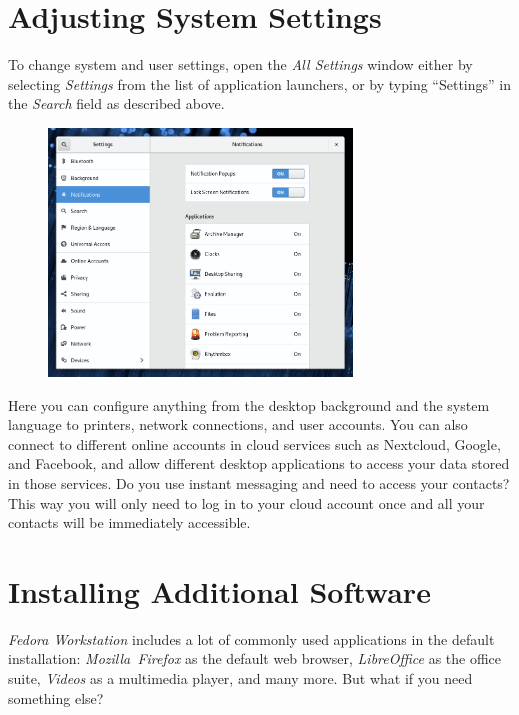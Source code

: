 \section*{Adjusting System Settings}

To change system and user settings, open the \emph{All Settings} window either by selecting \emph{Settings} from the list of application launchers, or by typing \enquote{Settings} in the \emph{Search} field as described above.

\begin{figure}[tbp]
\begin{center}
\includegraphics[width=0.72\textwidth]{img/settings}
 \label{fig:settings}
\end{center}
\end{figure}

Here you can configure anything from the desktop background and the system language to printers, network connections, and user accounts. You can also connect to different online accounts in cloud services such as Nextcloud, Google, and Facebook, and allow different desktop applications to access your data stored in those services. Do you use instant messaging and need to access your contacts? This way you will only need to log in to your cloud account once and all your contacts will be immediately accessible.

\section*{Installing Additional Software}

\emph{Fedora Workstation} includes a lot of commonly used applications in the default installation: \emph{Mozilla~Firefox} as the default web browser, \emph{LibreOffice} as the office suite, \emph{Videos} as a multimedia player, and many more. But what if you need something else?

